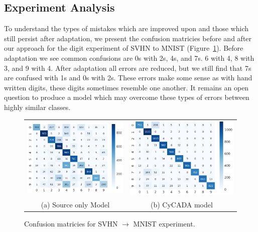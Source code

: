 \subsection{Experiment Analysis}
To understand the types of mistakes which are improved upon and those which still persist after adaptation, we present the confusion matricies before and after our approach for the digit experiment of SVHN to MNIST (Figure~\ref{fig:digit_err}). Before adaptation we see common confusions are 0s with 2s, 4s, and 7s. 6 with 4, 8 with 3, and 9 with 4. After adaptation all errors are reduced, but we still find that 7s are confused with 1s and 0s with 2s. These errors make some sense as with hand written digits, these digits sometimes resemble one another. It remains an open question to produce a model which may overcome these types of errors between highly similar classes.  
\begin{figure}
	\centering
	\begin{tabular}{cc}
		\includegraphics[width=.45\linewidth]{figs/confusionmat_svhn2mnist_src} &
		\includegraphics[width=.45\linewidth]{figs/confusionmat_svhn2mnist_cycada}\\
		(a) Source only Model & (b) CyCADA model
	\end{tabular}	
	\caption{Confusion matricies for SVHN $\rightarrow$ MNIST experiment. }
	\label{fig:digit_err}
\end{figure}

